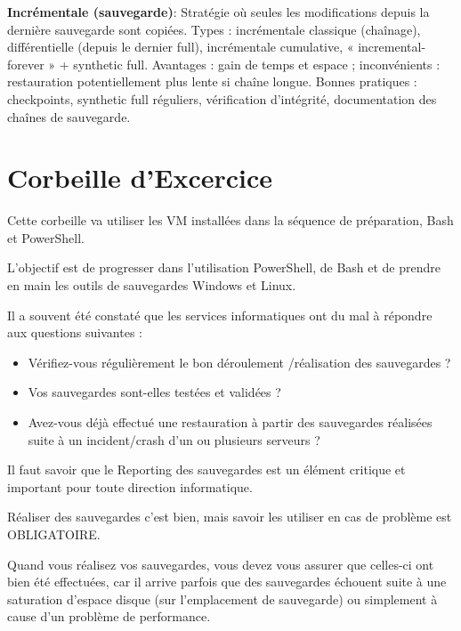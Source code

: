 \vspace{0.5cm}

\noindent \textbf{Incrémentale (sauvegarde)}:
Stratégie où seules les modifications depuis la dernière sauvegarde sont copiées. Types : incrémentale classique (chaînage), différentielle (depuis le dernier full), incrémentale cumulative, « incremental-forever » + synthetic full. Avantages : gain de temps et espace ; inconvénients : restauration potentiellement plus lente si chaîne longue. Bonnes pratiques : checkpoints, synthetic full réguliers, vérification d'intégrité, documentation des chaînes de sauvegarde.

\newpage

\section*{Corbeille d'Excercice}
\noindent Cette corbeille va utiliser les VM installées dans la séquence de préparation, Bash et PowerShell.

\noindent L’objectif est de progresser dans l’utilisation PowerShell, de Bash et de prendre en main les outils de sauvegardes Windows et Linux.

\noindent Il a souvent été constaté que les services informatiques ont du mal à répondre aux questions suivantes :

\begin{itemize}
	\item Vérifiez-vous régulièrement le bon déroulement /réalisation des sauvegardes ?
	\item Vos sauvegardes sont-elles testées et validées ?
	\item Avez-vous déjà effectué une restauration à partir des sauvegardes réalisées suite à un incident/crash d'un ou plusieurs serveurs ?
\end{itemize}

\noindent Il faut savoir que le Reporting des sauvegardes est un élément critique et important pour toute direction
informatique.

\noindent Réaliser des sauvegardes c'est bien, mais savoir les utiliser en cas de problème est OBLIGATOIRE.

\noindent Quand vous réalisez vos sauvegardes, vous devez vous assurer que celles-ci ont bien été effectuées, car il arrive parfois que des sauvegardes échouent suite à une saturation d'espace disque (sur l'emplacement de sauvegarde) ou simplement à cause d'un problème de performance.

